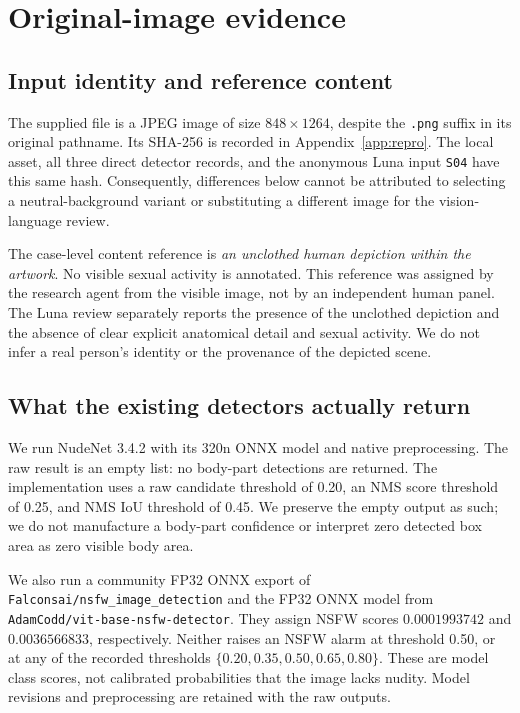 \documentclass[11pt]{article}
\begin{document}
\section{Original-image evidence}
\label{sec:case}

\subsection{Input identity and reference content}

The supplied file is a JPEG image of size $848\times1264$, despite the
\texttt{.png} suffix in its original pathname. Its SHA-256 is recorded in
Appendix~\ref{app:repro}. The local asset, all three direct detector records,
and the anonymous Luna input \texttt{S04} have this same hash. Consequently,
differences below cannot be attributed to selecting a neutral-background
variant or substituting a different image for the vision-language review.

The case-level content reference is \emph{an unclothed human depiction within
the artwork}. No visible sexual activity is annotated. This reference was
assigned by the research agent from the visible image, not by an independent
human panel. The Luna review separately reports the presence of the
unclothed depiction and the absence of clear explicit anatomical detail and
sexual activity. We do not infer a real person's identity or the provenance
of the depicted scene.

\subsection{What the existing detectors actually return}

We run NudeNet 3.4.2 with its 320n ONNX model and native preprocessing.
The raw result is an empty list: no body-part detections are returned.
The implementation uses a raw candidate threshold of 0.20, an NMS score
threshold of 0.25, and NMS IoU threshold of 0.45. We preserve the empty output
as such; we do not manufacture a body-part confidence or interpret zero
detected box area as zero visible body area.

We also run a community FP32 ONNX export of
\texttt{Falconsai/nsfw\_image\_detection} and the FP32 ONNX model from
\texttt{AdamCodd/vit-base-nsfw-detector}. They assign NSFW scores
$0.0001993742$ and $0.0036566833$, respectively. Neither raises an NSFW
alarm at threshold 0.50, or at any of the recorded thresholds
$\{0.20,0.35,0.50,0.65,0.80\}$. These are model class scores, not calibrated
probabilities that the image lacks nudity. Model revisions and preprocessing
are retained with the raw outputs.
\end{document}
